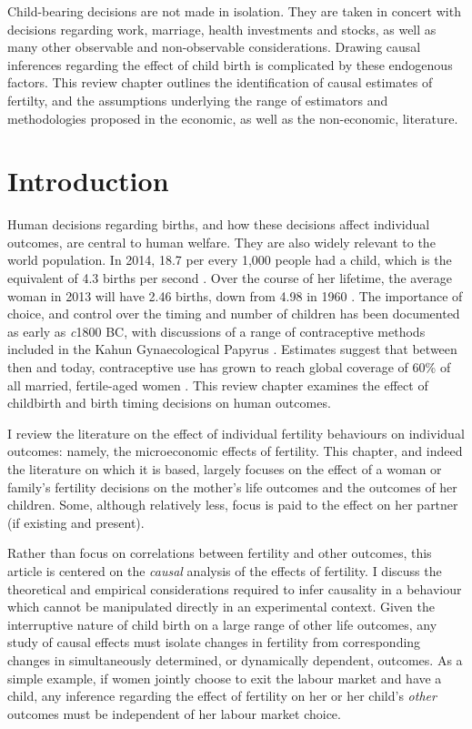 \begin{chapabstract}
Child-bearing decisions are not made in isolation.  They are taken in concert 
with decisions regarding work, marriage, health investments and stocks, as well 
as many other observable and non-observable considerations.  Drawing causal 
inferences regarding the effect of child birth is complicated by these 
endogenous factors.  This review chapter outlines the identification of causal
estimates of fertilty, and the assumptions underlying the range of estimators
and methodologies proposed in the economic, as well as the non-economic, 
literature.
\end{chapabstract}

\newpage
\section{Introduction}
Human decisions regarding births, and how these decisions affect individual 
outcomes, are central to human welfare.  They are also widely relevant to the
world population.  In 2014, 18.7 per every 1,000 people had a child, which is 
the equivalent of 4.3 births per second \citep{CIA2014}. Over the course of her 
lifetime, the average woman in 2013 will have 2.46 births, down from 4.98 in 
1960 \citep{WorldBank2015}. The importance of choice, and control over the 
timing and number of children has been documented as early as \emph{c}1800 BC, 
with discussions of a range of contraceptive methods included in the Kahun 
Gynaecological Papyrus \citep{OdowdPhillip1994}.  Estimates suggest that 
between then and today,
contraceptive use has grown to reach global coverage of 60\% of all married,
fertile-aged women \citep{Darroch2013}. This review chapter examines the effect 
of childbirth and birth timing decisions on human outcomes.

I review the literature on the effect of individual fertility behaviours on
individual outcomes: namely, the microeconomic effects of fertility.  This
chapter, and indeed the literature on which it is based, largely focuses on 
the effect of a woman or family's fertility decisions on the mother's life 
outcomes and the outcomes of her children.  Some, although relatively less, 
focus is paid to the effect on her partner (if existing and present).  

Rather than focus on correlations between fertility and other outcomes, this 
article is centered on the \emph{causal} analysis of the effects of fertility.  
I discuss the theoretical and empirical considerations required to infer causality 
in a behaviour which cannot be manipulated directly in an experimental context.  
Given the interruptive nature of child birth on a large range of other life 
outcomes, any study of causal effects must isolate changes in fertility from 
corresponding changes in simultaneously determined, or dynamically dependent, 
outcomes.  As a simple example, if women jointly choose to exit the labour 
market and have a child, any inference regarding the effect of fertility on her 
or her child's \emph{other} outcomes must be independent of her labour market 
choice.

